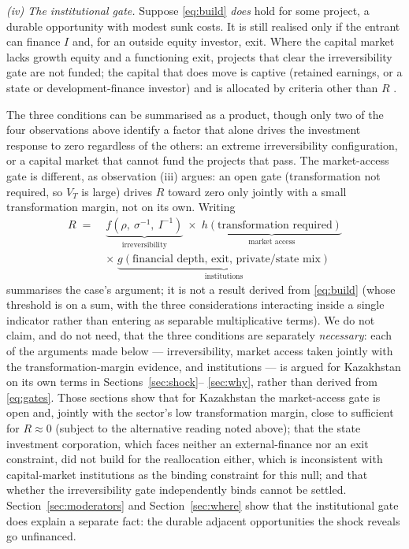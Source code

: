 \documentclass[12pt]{article}
\begin{document}
\emph{(iv) The institutional gate.} Suppose \eqref{eq:build} \emph{does} hold for some
project, a durable opportunity with modest sunk costs. It is still realised only if the
entrant can finance $I$ and, for an outside equity investor, exit. Where the capital market
lacks growth equity and a functioning exit, projects that clear the irreversibility gate are
not funded; the capital that does move is captive (retained earnings, or a state or
development-finance investor) and is allocated by criteria other than $R$
\citep{khanna1997,khannapalepu2000,rajanzingales1998}.

The three conditions can be summarised as a product, though only two of the four observations
above identify a factor that alone drives the investment response to zero regardless of the
others: an extreme irreversibility configuration, or a capital market that cannot fund the
projects that pass. The market-access gate is different, as observation (iii) argues: an open
gate (transformation not required, so $V_T$ is large) drives $R$ toward zero only jointly with
a small transformation margin, not on its own. Writing
\begin{equation}
\begin{aligned}
R \;=\;& \underbrace{f\!\left(\rho,\ \sigma^{-1},\ I^{-1}\right)}_{\text{irreversibility}}
\;\times\; \underbrace{h(\text{transformation required})}_{\text{market access}} \\[2pt]
&\times\; \underbrace{g(\text{financial depth, exit, private/state mix})}_{\text{institutions}}
\end{aligned}
\label{eq:gates}
\end{equation}
summarises the case's argument; it is not a result derived from \eqref{eq:build} (whose
threshold is on a sum, with the three considerations interacting inside a single indicator
rather than entering as separable multiplicative terms). We do not claim, and do not need,
that the three conditions are separately \emph{necessary}: each of the arguments made below
--- irreversibility, market access taken jointly with the transformation-margin evidence, and
institutions --- is argued for Kazakhstan on its own terms in Sections~\ref{sec:shock}--%
\ref{sec:why}, rather than derived from \eqref{eq:gates}. Those sections show that for
Kazakhstan the market-access gate is open and, jointly with the sector's low transformation
margin, close to sufficient for $R \approx 0$ (subject to the alternative reading noted above);
that the state investment corporation, which faces neither an external-finance nor an exit
constraint, did not build for the reallocation either, which is inconsistent with capital-market
institutions
as the binding constraint for this null; and that whether the irreversibility gate
independently binds cannot be settled. Section~\ref{sec:moderators} and Section~\ref{sec:where}
show that the institutional gate does explain a separate fact: the durable adjacent
opportunities the shock reveals go unfinanced.
\end{document}
